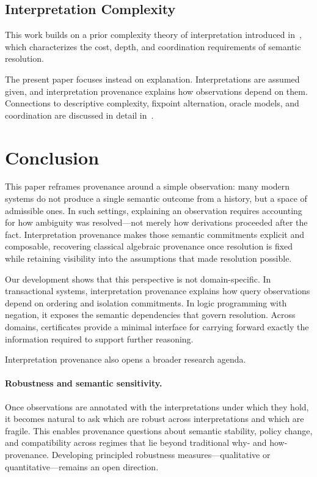 \documentclass[acmsmall,nonacm]{acmart}
\theoremstyle{remark}
\numberwithin{definition}{section}
\numberwithin{theorem}{section}
\numberwithin{lemma}{section}
\numberwithin{corollary}{section}
\numberwithin{remark}{section}
\numberwithin{example}{section}
\numberwithin{observation}{section}
\numberwithin{assumption}{section}
\begin{document}
\subsection{Interpretation Complexity}

This work builds on a prior complexity theory of interpretation
introduced in~\cite{hellerstein2026interpretation}, which characterizes the cost,
depth, and coordination requirements of semantic resolution.

The present paper focuses instead on explanation.
Interpretations are assumed given, and interpretation provenance explains how
observations depend on them.
Connections to descriptive complexity, fixpoint alternation, oracle models, and
coordination are discussed in detail in~\cite{hellerstein2026interpretation}.

\section{Conclusion}
\label{sec:conclusion}

This paper reframes provenance around a simple observation: many modern systems do
not produce a single semantic outcome from a history, but a space of admissible
ones.
In such settings, explaining an observation requires accounting for how ambiguity
was resolved—not merely how derivations proceeded after the fact.
Interpretation provenance makes those semantic commitments explicit and
composable, recovering classical algebraic provenance once resolution is fixed
while retaining visibility into the assumptions that made resolution possible.

Our development shows that this perspective is not domain-specific.
In transactional systems, interpretation provenance explains how query
observations depend on ordering and isolation commitments.
In logic programming with negation, it exposes the semantic dependencies that
govern resolution.
Across domains, certificates provide a minimal interface for carrying forward
exactly the information required to support further reasoning.

Interpretation provenance also opens a broader research agenda.

\paragraph{Robustness and semantic sensitivity.}
Once observations are annotated with the interpretations under which they hold, it
becomes natural to ask which are robust across interpretations and which are
fragile.
This enables provenance questions about semantic stability, policy change, and
compatibility across regimes that lie beyond traditional why- and how-provenance.
Developing principled robustness measures—qualitative or quantitative—remains an
open direction.
\end{document}
